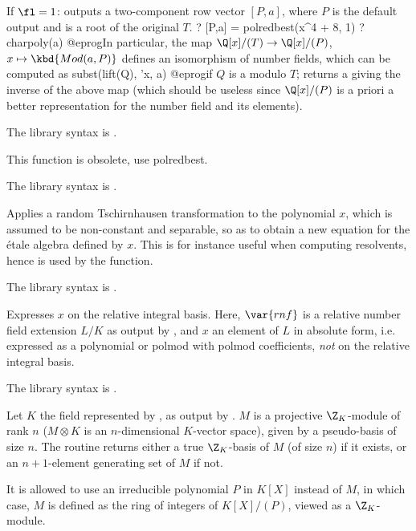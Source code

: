 If $\fl = 1$: outputs a two-component row vector $[P,a]$,  where $P$ is the
default output and  is a root of the original $T$.
\bprog
? [P,a] = polredbest(x^4 + 8, 1)
? charpoly(a)
@eprog\noindent In particular, the map $\Q[x]/(T) \to \Q[x]/(P)$,
$x\mapsto \kbd{Mod(a,P)}$ defines an isomorphism of number fields, which can
be computed as
\bprog
  subst(lift(Q), 'x, a)
@eprog\noindent if $Q$ is a  modulo $T$; 
returns a  giving the inverse of the above map (which should be
useless since $\Q[x]/(P)$ is a priori a better representation for the number
field and its elements).

The library syntax is .

\label{se:polredord}
This function is obsolete, use polredbest.

The library syntax is .

\label{se:poltschirnhaus}
Applies a random Tschirnhausen
transformation to the polynomial $x$, which is assumed to be non-constant
and separable, so as to obtain a new equation for the \'etale algebra
defined by $x$. This is for instance useful when computing resolvents,
hence is used by the  function.

The library syntax is .

\label{se:rnfalgtobasis}
Expresses $x$ on the relative
integral basis. Here, $\var{rnf}$ is a relative number field extension $L/K$
as output by , and $x$ an element of $L$ in absolute form, i.e.
expressed as a polynomial or polmod with polmod coefficients, \emph{not} on
the relative integral basis.

The library syntax is .

\label{se:rnfbasis}
Let $K$ the field represented by
, as output by . $M$ is a projective $\Z_K$-module
of rank $n$ ($M\otimes K$ is an $n$-dimensional $K$-vector space), given by a
pseudo-basis of size $n$. The routine returns either a true $\Z_K$-basis of
$M$ (of size $n$) if it exists, or an $n+1$-element generating set of $M$ if
not.

It is allowed to use an irreducible polynomial $P$ in $K[X]$ instead of $M$,
in which case, $M$ is defined as the ring of integers of $K[X]/(P)$, viewed
as a $\Z_K$-module.


